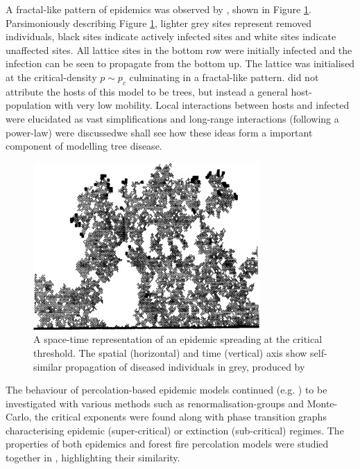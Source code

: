 A fractal-like pattern of epidemics was observed by \cite{GRASSBERGER1986273}, shown in Figure \ref{fig:1d_perc_basis}. Parsimoniously describing Figure \ref{fig:1d_perc_basis}, lighter grey sites represent removed individuals, black sites indicate actively infected sites and white sites indicate unaffected sites. All lattice sites in the bottom row were initially infected and the infection can be seen to propagate from the bottom up. The lattice was initialised at the critical-density $p\sim p_c$ culminating in a fractal-like pattern. \cite{GRASSBERGER1986273} did not attribute the hosts of this model to be trees, but instead a general host-population with very low mobility. Local interactions between hosts and infected were elucidated as vast simplifications and long-range interactions (following a power-law) were discussed\textemdash we shall see how these ideas form a important component of modelling tree disease.

\begin{figure}
    \centering
    \includegraphics{chapter2/figures/perc1.jpg}
    \caption{A space-time representation of an epidemic spreading at the critical threshold. The spatial (horizontal) and time (vertical) axis show self-similar propagation of diseased individuals in grey, produced by \cite{GRASSBERGER1986273}}
    \label{fig:1d_perc_basis}
\end{figure}

The behaviour of percolation-based epidemic models continued (e.g. \cite{pub.1060474189, pub.1059069981}) to be investigated with various methods such as renormalisation-groups and Monte-Carlo, the critical exponents were found along with phase transition graphs characterising epidemic (super-critical) or extinction (sub-critical) regimes. The properties of both epidemics and forest fire percolation models were studied together in \cite{pub.1052857560}, highlighting their similarity.

